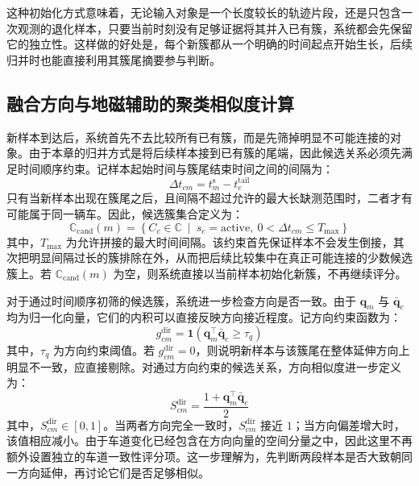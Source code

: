 \documentclass{xdupgthesis}
\begin{document}
这种初始化方式意味着，无论输入对象是一个长度较长的轨迹片段，还是只包含一次观测的退化样本，只要当前时刻没有足够证据将其并入已有簇，系统都会先保留它的独立性。这样做的好处是，每个新簇都从一个明确的时间起点开始生长，后续归并时也能直接利用其簇尾摘要参与判断。


\subsection{融合方向与地磁辅助的聚类相似度计算}

新样本到达后，系统首先不去比较所有已有簇，而是先筛掉明显不可能连接的对象。由于本章的归并方式是将后续样本接到已有簇的尾端，因此候选关系必须先满足时间顺序约束。记样本起始时间与簇尾结束时间之间的间隔为：
\begin{equation}
	\Delta t_{cm}=t_m^{\mathrm{s}}-t_c^{\mathrm{tail}}
\end{equation}
只有当新样本出现在簇尾之后，且间隔不超过允许的最大长缺测范围时，二者才有可能属于同一辆车。因此，候选簇集合定义为：
\begin{equation}
	\mathbb{C}_{\mathrm{cand}}(m)=
	\left\{
	C_c\in\mathbb{C}\ \middle|\ s_c=\mathrm{active},\ 0<\Delta t_{cm}\le T_{\max}
	\right\}
\end{equation}
其中，$T_{\max}$ 为允许拼接的最大时间间隔。该约束首先保证样本不会发生倒接，其次把明显间隔过长的簇排除在外，从而把后续比较集中在真正可能连接的少数候选簇上。若 $\mathbb{C}_{\mathrm{cand}}(m)$ 为空，则系统直接以当前样本初始化新簇，不再继续评分。

对于通过时间顺序初筛的候选簇，系统进一步检查方向是否一致。由于 $\mathbf{q}_m$ 与 $\bar{\mathbf{q}}_c$ 均为归一化向量，它们的内积可以直接反映方向接近程度。记方向约束函数为：
\begin{equation}
	g_{cm}^{\mathrm{dir}}=
	\mathbf{1}
	\left(
	\mathbf{q}_m^{\top}\bar{\mathbf{q}}_c\ge \tau_q
	\right)
\end{equation}
其中，$\tau_q$ 为方向约束阈值。若 $g_{cm}^{\mathrm{dir}}=0$，则说明新样本与该簇尾在整体延伸方向上明显不一致，应直接剔除。对通过方向约束的候选关系，方向相似度进一步定义为：
\begin{equation}
	S_{cm}^{\mathrm{dir}}=
	\frac{1+\mathbf{q}_m^{\top}\bar{\mathbf{q}}_c}{2}
\end{equation}
其中，$S_{cm}^{\mathrm{dir}}\in[0,1]$。当两者方向完全一致时，$S_{cm}^{\mathrm{dir}}$ 接近 $1$；当方向偏差增大时，该值相应减小。由于车道变化已经包含在方向向量的空间分量之中，因此这里不再额外设置独立的车道一致性评分项。这一步理解为，先判断两段样本是否大致朝同一方向延伸，再讨论它们是否足够相似。
\end{document}
